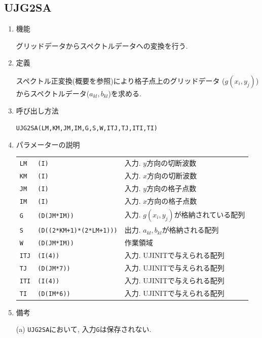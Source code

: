 \documentclass[a4j,fleqn]{jarticle}
\begin{document}

\subsection{UJG2SA}

\begin{enumerate}

\item 機能 

グリッドデータからスペクトルデータへの変換を行う.

\item 定義

スペクトル正変換(概要を参照)により格子点上のグリッドデータ
($g(x_i,y_j)$)からスペクトルデータ($a_{kl},b_{kl}$)を求める.

\item 呼び出し方法 

{\tt UJG2SA(LM,KM,JM,IM,G,S,W,ITJ,TJ,ITI,TI)}
  
\item パラメーターの説明

\begin{tabular}{lll}
{\tt LM} & {\tt (I)} & 入力. $y$方向の切断波数\\
{\tt KM} & {\tt (I)} & 入力. $x$方向の切断波数\\
{\tt JM} & {\tt (I)} & 入力. $y$方向の格子点数\\
{\tt IM} & {\tt (I)} & 入力. $x$方向の格子点数\\
{\tt G} & {\tt (D(JM*IM))} & 入力. $g(x_i,y_j)$が格納されている配列\\
{\tt S} & {\tt (D((2*KM+1)*(2*LM+1)))} & 出力. $a_{kl},b_{kl}$が格納される配列\\
{\tt W} & {\tt (D(JM*IM))} & 作業領域\\
{\tt ITJ} & {\tt (I(4))} & 入力. UJINITで与えられる配列\\
{\tt TJ} & {\tt (D(JM*7))} & 入力. UJINITで与えられる配列\\
{\tt ITI} & {\tt (I(4))} & 入力. UJINITで与えられる配列\\
{\tt TI} & {\tt (D(IM*6))} & 入力. UJINITで与えられる配列
\end{tabular}

\item 備考

(a) {\tt UJG2SA}において, 入力{\tt G}は保存されない.

\end{enumerate}
\end{document}
